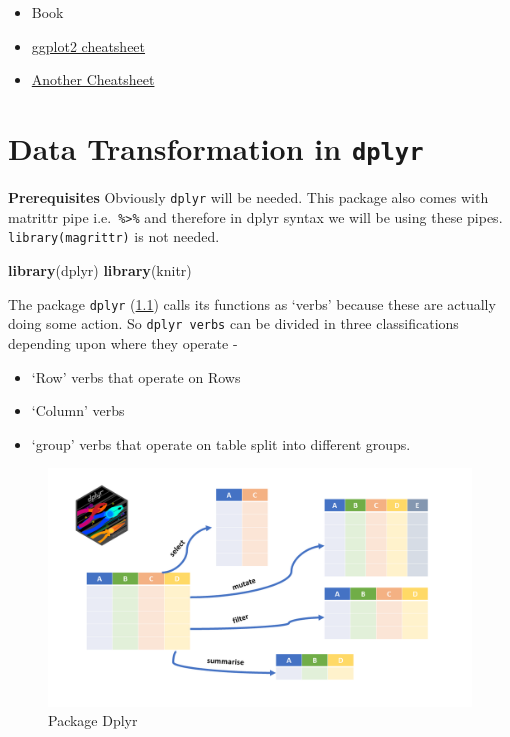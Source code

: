 \documentclass[
]{book}
\newenvironment{Shaded}{\begin{snugshade}}{\end{snugshade}}
\newcommand{\FunctionTok}[1]{\textcolor[rgb]{0.13,0.29,0.53}{\textbf{#1}}}
\newcommand{\NormalTok}[1]{#1}
\providecommand{\tightlist}{%
  \setlength{\itemsep}{0pt}\setlength{\parskip}{0pt}}
\begin{document}
\begin{itemize}
\tightlist
\item
  Book \citep{ggplot22016}
\item
  \href{https://posit.co/wp-content/uploads/2022/10/data-visualization-1.pdf}{ggplot2 cheatsheet}
\item
  \href{http://r-statistics.co/ggplot2-cheatsheet.html}{Another Cheatsheet}
\end{itemize}

\hypertarget{data-transformation-in-dplyr}{%
\chapter{\texorpdfstring{Data Transformation in \texttt{dplyr}}{Data Transformation in dplyr}}\label{data-transformation-in-dplyr}}

\textbf{Prerequisites}
Obviously \texttt{dplyr} \citep{R-dplyr} will be needed. This package also comes with matrittr pipe i.e.~\texttt{\%\textgreater{}\%} and therefore in dplyr syntax we will be using these pipes. \texttt{library(magrittr)} is not needed.

\begin{Shaded}
\begin{Highlighting}[]
\FunctionTok{library}\NormalTok{(dplyr)}
\FunctionTok{library}\NormalTok{(knitr)}
\end{Highlighting}
\end{Shaded}

The package \texttt{dplyr} (\ref{fig:dplyrr}) calls its functions as `verbs' because these are actually doing some action. So \texttt{dplyr\ verbs} can be divided in three classifications depending upon where they operate -

\begin{itemize}
\tightlist
\item
  `Row' verbs that operate on Rows
\item
  `Column' verbs
\item
  `group' verbs that operate on table split into different groups.
\end{itemize}

\begin{figure}

{\centering \includegraphics[width=0.99\linewidth]{images/dplyr} 

}

\caption{Package Dplyr}\label{fig:dplyrr}
\end{figure}
\end{document}
